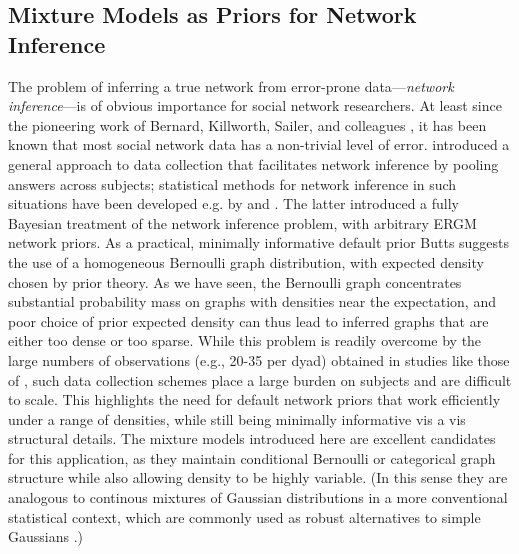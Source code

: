 \documentclass[11pt]{article}
\begin{document}


\subsection{Mixture Models as Priors for Network Inference}

The problem of inferring a true network from error-prone data---\emph{network inference}---is of obvious importance for social network researchers.  At least since the pioneering work of Bernard, Killworth, Sailer, and colleagues \citep[e.g.][]{killworth.bernard:ho:1976,bernard.killworth:hcr:1977, killworth.bernard:sn:1979,bernard.et.al:sn:1979, bernard.et.al:ara:1984}, it has been known that most social network data has a non-trivial level of error.  \citet{krackhardt:sn:1987a} introduced a general approach to data collection that facilitates network inference by pooling answers across subjects; statistical methods for network inference in such situations have been developed e.g. by \citet{kumbasar.et.al:ajs:1994} and \citet{butts:sn:2003}.  The latter introduced a fully Bayesian treatment of the network inference problem, with arbitrary ERGM network priors.  As a practical, minimally informative default prior Butts suggests the use of a homogeneous Bernoulli graph distribution, with expected density chosen by prior theory.  As we have seen, the Bernoulli graph concentrates substantial probability mass on graphs with densities near the expectation, and poor choice of prior expected density can thus lead to inferred graphs that are either too dense or too sparse.  While this problem is readily overcome by the large numbers of observations (e.g., 20-35 per dyad) obtained in studies like those of \citet{krackhardt:sn:1987a,krackhardt:asq:1990}, such data collection schemes place a large burden on subjects and are difficult to scale.  This highlights the need for default network priors that work efficiently under a range of densities, while still being minimally informative vis a vis structural details.  The mixture models introduced here are excellent candidates for this application, as they maintain conditional Bernoulli or categorical graph structure while also allowing density to be highly variable.  (In this sense they are analogous to continous mixtures of Gaussian distributions in a more conventional statistical context, which are commonly used as robust alternatives to simple Gaussians \citep{gelman.et.al:bk:2003}.)
\end{document}

